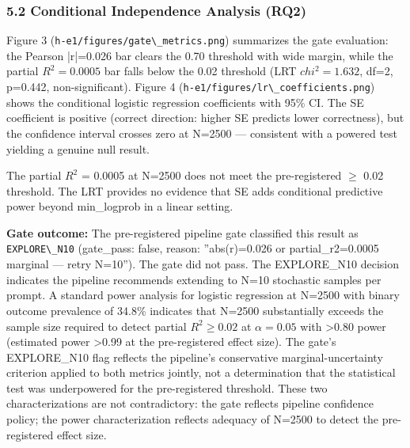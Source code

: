 \subsubsection{5.2 Conditional Independence Analysis (RQ2)}

Figure 3 (\texttt{h-e1/figures/gate\textbackslash \_metrics.png}) summarizes the gate evaluation: the Pearson |r|=0.026 bar clears the 0.70 threshold with wide margin, while the partial $R^{2}=0.0005$ bar falls below the 0.02 threshold (LRT $chi^{2}=1.632$, df=2, p=0.442, non-significant). Figure 4 (\texttt{h-e1/figures/lr\textbackslash \_coefficients.png}) shows the conditional logistic regression coefficients with 95\% CI. The SE coefficient is positive (correct direction: higher SE predicts lower correctness), but the confidence interval crosses zero at N=2500 --- consistent with a powered test yielding a genuine null result.

\begin{table}[htbp]
\centering
{}
\end{table}

The partial $R^2$ = 0.0005 at N=2500 does not meet the pre-registered $\geq$ 0.02 threshold. The LRT provides no evidence that SE adds conditional predictive power beyond min\_logprob in a linear setting.

\textbf{Gate outcome:} The pre-registered pipeline gate classified this result as \texttt{EXPLORE\textbackslash \_N10} (gate\_pass: false, reason: ''abs(r)=0.026 or partial\_r2=0.0005 marginal --- retry N=10''). The gate did not pass. The EXPLORE\_N10 decision indicates the pipeline recommends extending to N=10 stochastic samples per prompt. A standard power analysis for logistic regression at N=2500 with binary outcome prevalence of 34.8\% indicates that N=2500 substantially exceeds the sample size required to detect partial $R^{2}\geq 0.02$ at $\alpha =0.05$ with >0.80 power (estimated power >0.99 at the pre-registered effect size). The gate's EXPLORE\_N10 flag reflects the pipeline's conservative marginal-uncertainty criterion applied to both metrics jointly, not a determination that the statistical test was underpowered for the pre-registered threshold. These two characterizations are not contradictory: the gate reflects pipeline confidence policy; the power characterization reflects adequacy of N=2500 to detect the pre-registered effect size.

